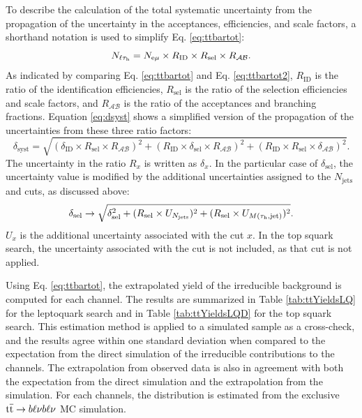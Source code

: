 To describe the calculation of the total systematic uncertainty from the propagation of the uncertainty in the acceptances, efficiencies, and scale factors, a shorthand notation is used to simplify Eq. \eqref{eq:ttbartot}:
\begin{equation}
\label{eq:ttbartot2}
N_{\ell\tau_{\text{h}}} = N_{\mathrm{e}\mu} \times R_{\text{ID}} \times R_{\text{sel}} \times R_{\mathcal{A}\mathcal{B}}.
\end{equation}
As indicated by comparing Eq. \eqref{eq:ttbartot} and Eq. \eqref{eq:ttbartot2}, $R_{\text{ID}}$ is the ratio of the identification efficiencies, $R_{\text{sel}}$ is the ratio of the selection efficiencies and scale factors, and $R_{\mathcal{A}\mathcal{B}}$ is the ratio of the acceptances and branching fractions. Equation \eqref{eq:dsyst} shows a simplified version of the propagation of the uncertainties from these three ratio factors:
\begin{equation}
\label{eq:dsyst}
\delta_{\text{syst}} = \sqrt{ (\delta_{\text{ID}} \times R_{\text{sel}} \times R_{\mathcal{A}\mathcal{B}})^2 + (R_{\text{ID}} \times \delta_{\text{sel}} \times R_{\mathcal{A}\mathcal{B}})^2 + (R_{\text{ID}} \times R_{\text{sel}} \times \delta_{\mathcal{A}\mathcal{B}})^2}.
\end{equation}
The uncertainty in the ratio $R_x$ is written as $\delta_x$. In the particular case of $\delta_{\text{sel}}$, the uncertainty value is modified by the additional uncertainties assigned to the $N_{\text{jets}}$ and \MassTJ cuts, as discussed above:
\begin{equation}
\delta_{\text{sel}} \rightarrow \sqrt{ \delta_{\text{sel}}^2 + (R_{\text{sel}} \times U_{N_{\text{jets}}})^2 + (R_{\text{sel}} \times U_{M(\tau_{\text{h}},\text{jet})})^2}.
\end{equation}
$U_x$ is the additional uncertainty associated with the cut $x$. In the top squark search, the uncertainty associated with the \MassTJ cut is not included, as that cut is not applied.

Using Eq. \ref{eq:ttbartot}, the extrapolated yield of the \ttbar irreducible background is computed for each \ltau channel. The results are summarized in Table \ref{tab:ttYieldsLQ} for the leptoquark search and in Table \ref{tab:ttYieldsLQD} for the top squark search. This estimation method is applied to a simulated \emu sample as a cross-check, and the results agree within one standard deviation when compared to the expectation from the direct simulation of the irreducible \ttbar contributions to the \ltau channels. The extrapolation from observed data is also in agreement with both the expectation from the direct \ttbar \ltau simulation and the extrapolation from the \emu simulation. For each \ltau channels, the \ttbar \ST distribution is estimated from the exclusive $\mathrm{t}\overline{\mathrm{t}} \rightarrow b\ell\nu b\ell\nu$ MC simulation.

